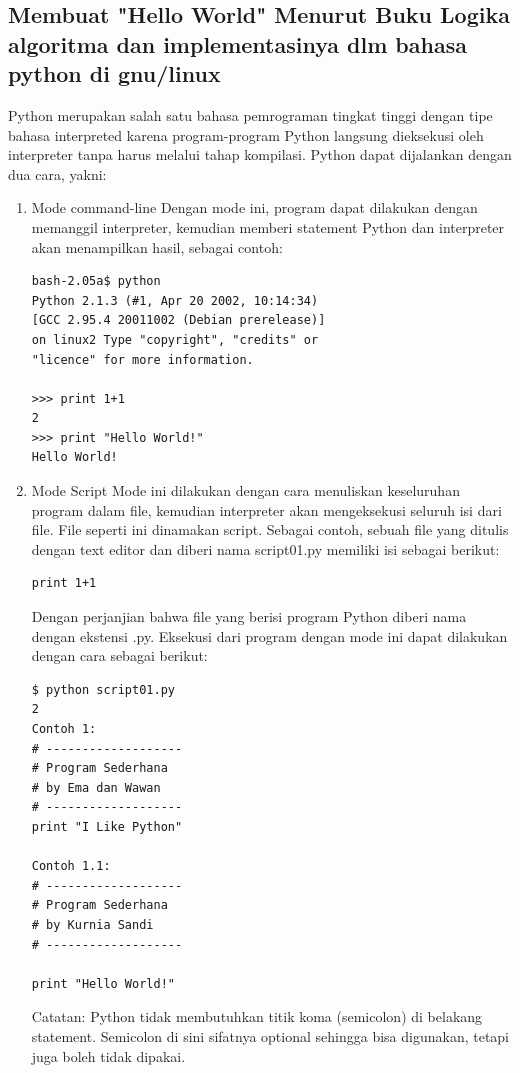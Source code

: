 \documentclass[12pt]{article}
\begin{document}
\subsection{Membuat "Hello World" Menurut Buku Logika algoritma dan implementasinya dlm bahasa python di gnu/linux}
Python merupakan salah satu bahasa pemrograman tingkat tinggi dengan tipe bahasa interpreted karena program-program Python langsung dieksekusi oleh interpreter tanpa harus melalui tahap kompilasi. Python dapat dijalankan dengan dua cara, yakni:
\begin{enumerate}
\item Mode command-line
Dengan mode ini, program dapat dilakukan dengan memanggil interpreter, kemudian memberi statement Python dan interpreter akan menampilkan hasil, sebagai contoh:
\begin{verbatim}
bash-2.05a$ python
Python 2.1.3 (#1, Apr 20 2002, 10:14:34)
[GCC 2.95.4 20011002 (Debian prerelease)] 
on linux2 Type "copyright", "credits" or 
"licence" for more information.

>>> print 1+1
2
>>> print "Hello World!"
Hello World!
\end{verbatim}

\item Mode Script
Mode ini dilakukan dengan cara menuliskan keseluruhan program dalam file, kemudian interpreter akan mengeksekusi seluruh isi dari file. File seperti ini dinamakan script. Sebagai contoh, sebuah file yang ditulis dengan text editor dan diberi nama script01.py memiliki isi sebagai berikut:
\begin{verbatim}
print 1+1
\end{verbatim}
Dengan perjanjian bahwa file yang berisi program Python diberi nama dengan ekstensi .py. Eksekusi dari program dengan mode ini dapat dilakukan dengan cara sebagai berikut:
\begin{verbatim}
$ python script01.py
2
Contoh 1:
# -------------------
# Program Sederhana
# by Ema dan Wawan
# -------------------
print "I Like Python"

Contoh 1.1:
# -------------------
# Program Sederhana
# by Kurnia Sandi
# -------------------

print "Hello World!"
\end{verbatim}
Catatan: Python tidak membutuhkan titik koma (semicolon) di belakang statement. Semicolon di sini sifatnya optional sehingga bisa digunakan, tetapi juga boleh tidak dipakai\cite{utami2004logika}.
\end{enumerate}
\end{document}
